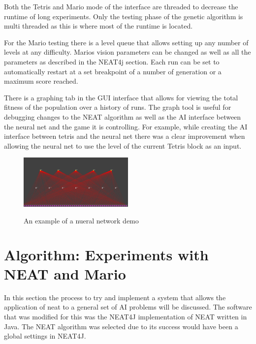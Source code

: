 \documentclass[12pt]{ucthesis} \newif\ifpdf \ifx\pdfoutput\undefined
\begin{document}
Both the Tetris and Mario mode of the interface are threaded to decrease the
runtime of long experiments. Only the testing phase of the genetic algorithm is
multi threaded as this is where most of the runtime is located.

For the Mario testing there is a level queue that allows setting up any number
of levels at any difficulty.  Marios vision parameters can be changed as well as
all the parameters as described in the NEAT4j section. Each run can be set to
automatically restart at a set breakpoint of a number of generation or a maximum
score reached.

There is a graphing tab in the GUI interface that allows for viewing the total
fitness of the population over a history of runs. The graph tool is useful for
debugging changes to the NEAT algorithm as well as the AI interface between the
neural net and the game it is controlling. For example, while creating the AI
interface between tetris and the neural net there was a clear improvement when
allowing the neural net to use the level of the current Tetris block as an
input.

\begin{figure}[h!]
  \caption{An example of a nueral network demo}
  \centering
    \includegraphics[width=0.5\textwidth]{simplemarionet.png}
   \label{fig:simplemarionet} 
\end{figure}


\chapter{Algorithm: Experiments with NEAT and Mario}


In this section the process to try and implement a system that allows the
application of neat to a general set of AI problems will be discussed. The
software that was modified for this was the NEAT4J implementation of NEAT
written in Java. The NEAT algorithm was selected due to its success would have
been a global settings in NEAT4J.
\end{document}

